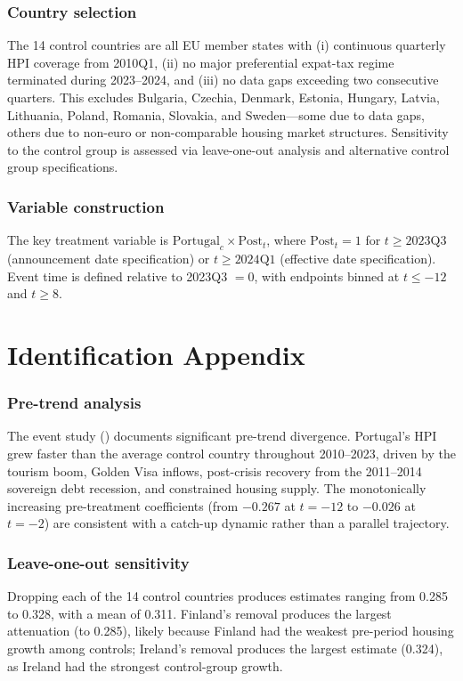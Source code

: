 \documentclass[12pt]{article}
\begin{document}
\subsubsection*{Country selection} The 14 control countries are all EU member states with (i) continuous quarterly HPI coverage from 2010Q1, (ii) no major preferential expat-tax regime terminated during 2023--2024, and (iii) no data gaps exceeding two consecutive quarters. This excludes Bulgaria, Czechia, Denmark, Estonia, Hungary, Latvia, Lithuania, Poland, Romania, Slovakia, and Sweden---some due to data gaps, others due to non-euro or non-comparable housing market structures. Sensitivity to the control group is assessed via leave-one-out analysis and alternative control group specifications.

\subsubsection*{Variable construction} The key treatment variable is $\text{Portugal}_c \times \text{Post}_t$, where $\text{Post}_t = 1$ for $t \geq 2023\text{Q3}$ (announcement date specification) or $t \geq 2024\text{Q1}$ (effective date specification). Event time is defined relative to 2023Q3 $= 0$, with endpoints binned at $t \leq -12$ and $t \geq 8$.

\section{Identification Appendix}

\subsubsection*{Pre-trend analysis} The event study () documents significant pre-trend divergence. Portugal's HPI grew faster than the average control country throughout 2010--2023, driven by the tourism boom, Golden Visa inflows, post-crisis recovery from the 2011--2014 sovereign debt recession, and constrained housing supply. The monotonically increasing pre-treatment coefficients (from $-0.267$ at $t = -12$ to $-0.026$ at $t = -2$) are consistent with a catch-up dynamic rather than a parallel trajectory.

\subsubsection*{Leave-one-out sensitivity} Dropping each of the 14 control countries produces estimates ranging from 0.285 to 0.328, with a mean of 0.311. Finland's removal produces the largest attenuation (to 0.285), likely because Finland had the weakest pre-period housing growth among controls; Ireland's removal produces the largest estimate (0.324), as Ireland had the strongest control-group growth.
\end{document}
